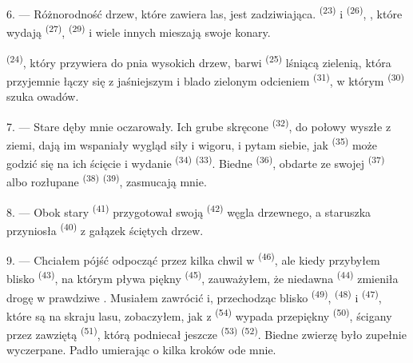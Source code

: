 6. --- Różnorodność drzew, które zawiera las, jest zadziwiająca. 
\textsuperscript{(23)} i  \textsuperscript{(26)}, , które
wydają  \textsuperscript{(27)},  \textsuperscript{(29)} i
wiele innych mieszają swoje konary.

 \textsuperscript{(24)}, który przywiera do pnia wysokich drzew, barwi
 \textsuperscript{(25)} lśniącą zielenią, która przyjemnie łączy się z
jaśniejszym i blado zielonym odcieniem  \textsuperscript{(31)}, w którym
 \textsuperscript{(30)} szuka owadów.

\VUsaut{3.0mm}
\VUsaut{3.0mm}

7. --- Stare dęby mnie oczarowały. Ich grube skręcone 
\textsuperscript{(32)}, do połowy wyszłe z ziemi, dają im wspaniały wygląd siły i wigoru,
i pytam siebie, jak  \textsuperscript{(35)} może godzić się na ich
ścięcie i wydanie  \textsuperscript{(34)} 
\textsuperscript{(33)}. Biedne  \textsuperscript{(36)}, obdarte ze swojej
 \textsuperscript{(37)} albo rozłupane 
\textsuperscript{(38)}  \textsuperscript{(39)}, zasmucają mnie.

8. --- Obok stary  \textsuperscript{(41)} przygotował swoją
 \textsuperscript{(42)} węgla drzewnego, a staruszka przyniosła
 \textsuperscript{(40)}  z gałązek ściętych drzew.

\VUsaut{3.0mm}
\VUsaut{3.0mm}

9. --- Chciałem pójść odpocząć przez kilka chwil w 
\textsuperscript{(46)}, ale kiedy przybyłem blisko  \textsuperscript{(43)},
na którym pływa piękny  \textsuperscript{(45)}, zauważyłem, że niedawna
 \textsuperscript{(44)} zmieniła drogę w prawdziwe .
Musiałem zawrócić i, przechodząc blisko  \textsuperscript{(49)},
 \textsuperscript{(48)} i  \textsuperscript{(47)}, które są
na skraju lasu, zobaczyłem, jak z  \textsuperscript{(54)} wypada
przepiękny  \textsuperscript{(50)}, ścigany przez zawziętą 
\textsuperscript{(51)}, którą podniecał jeszcze  \textsuperscript{(53)}
 \textsuperscript{(52)}. Biedne zwierzę było zupełnie
wyczerpane. Padło umierając o kilka kroków ode mnie.

